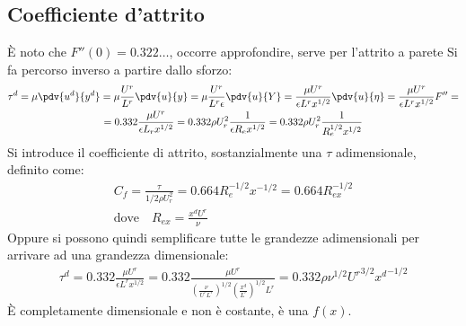 \subsection{Coefficiente d'attrito}
È noto che $F''(0) = 0.322\ldots$, occorre approfondire, serve per l'attrito a parete
Si fa percorso inverso a partire dallo sforzo:
%
	\begin{equation*}
		\begin{gathered}
			\tau^d = \mu \pdv{u^d}{y^d} = \mu \frac{U^r}{L^r} \pdv{u}{y} = \mu \frac{U^r}{L^r \epsilon} \pdv{u}{Y} = \frac{\mu U^r}{\epsilon L^r x^{1/2}} \pdv{u}{\eta} = \frac{\mu U^r}{\epsilon L^r x^{1/2}} F'' =\\
			= 0.332 \frac{\mu U^r}{\epsilon L_r x^{1/2}} = 0.332 \rho U^2_r \frac{1}{\epsilon R_e x^{1/2}} = 0.332 \rho U^2_r \frac{1}{R_e^{1/2} x^{1/2}}
		\end{gathered}
	\end{equation*}
%
Si introduce il coefficiente di attrito, sostanzialmente una $\tau$ adimensionale, definito come:
%
	\begin{equation*}
		\begin{gathered}
			C_f = \frac{\tau}{1/2 \rho U^2_r} = 0.664 R_e^{-1/2} x^{-1/2} = 0.664 R_{ex}^{-1/2}\\
			\text{dove} \quad R_{ex} = \frac{x^d U^r}{\nu}
		\end{gathered}
	\end{equation*}
%
Oppure si possono quindi semplificare tutte le grandezze adimensionali per arrivare ad una grandezza dimensionale:
%
	\begin{equation*}
		\begin{gathered}
			\tau^d = 0.332 \frac{\mu U^r}{\epsilon L^r x^{1/2}} = 0.332 \frac{\mu U^r}{ {\left( \frac{\nu}{U^r L^r} \right)}^{1/2} {\left( \frac{x^d}{L^r} \right)}^{1/2} L^r } = 0.332 \rho \nu^{1/2} {U^r}^{3/2} {x^d}^{-1/2}
		\end{gathered}
	\end{equation*}
%
È completamente dimensionale e non è costante, è una $f(x)$.


